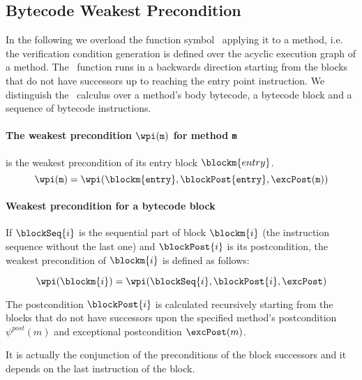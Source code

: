 

\subsection{Bytecode Weakest Precondition}\label{wpGraph}

In the following we overload the function symbol \wpi \ applying it to a method, i.e. the verification condition generation is defined over the acyclic execution graph of a method. 
The \wpi \ function runs in a backwards direction starting from the blocks that do not have successors up to reaching the entry point
 instruction. We distinguish the \wpi \ calculus over  a method's body bytecode, a bytecode block and a sequence of bytecode instructions.

\paragraph{The weakest precondition $\wpi(\tt{m})$ for method \texttt{m}} is the weakest precondition of its entry block $\blockm{entry}$. 
 $$\wpi(\tt{m}) = \wpi(\blockm{entry}, \blockPost{entry}, \excPost(m) ) $$
%

%


\paragraph{Weakest precondition for a bytecode block} If $\blockSeq{i}$ is the sequential part of block $\blockm{i}$ (the instruction sequence without the last one) and  $\blockPost{i}$ is its postcondition, the weakest precondition of $\blockm{i}$ is defined as follows:

$$ \wpi(\blockm{i}) = \wpi( \blockSeq{i}, \blockPost{i}, \excPost ) $$

The postcondition $\blockPost{i}$ is calculated recursively starting from the blocks that do not have successors upon the specified method's postcondition  $\psi^{post}(m)$ and exceptional postcondition $\excPost (m)$.
 
It is actually the conjunction of the preconditions
of the block successors and it depends on the last instruction of the block.

